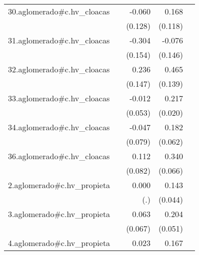 {\begin{longtable}{l*{4}{D{.}{.}{-1}}}
\addlinespace
30.aglomerado#c.hv\_cloacas&                     &      -0.060         &       0.168         &                     \\
            &                     &     (0.128)         &     (0.118)         &                     \\
\addlinespace
31.aglomerado#c.hv\_cloacas&                     &      -0.304\sym{*}  &      -0.076         &                     \\
            &                     &     (0.154)         &     (0.146)         &                     \\
\addlinespace
32.aglomerado#c.hv\_cloacas&                     &       0.236         &       0.465\sym{***}&                     \\
            &                     &     (0.147)         &     (0.139)         &                     \\
\addlinespace
33.aglomerado#c.hv\_cloacas&                     &      -0.012         &       0.217\sym{***}&                     \\
            &                     &     (0.053)         &     (0.020)         &                     \\
\addlinespace
34.aglomerado#c.hv\_cloacas&                     &      -0.047         &       0.182\sym{**} &                     \\
            &                     &     (0.079)         &     (0.062)         &                     \\
\addlinespace
36.aglomerado#c.hv\_cloacas&                     &       0.112         &       0.340\sym{***}&                     \\
            &                     &     (0.082)         &     (0.066)         &                     \\
\addlinespace
2.aglomerado#c.hv\_propieta&                     &       0.000         &       0.143\sym{**} &                     \\
            &                     &         (.)         &     (0.044)         &                     \\
\addlinespace
3.aglomerado#c.hv\_propieta&                     &       0.063         &       0.204\sym{***}&                     \\
            &                     &     (0.067)         &     (0.051)         &                     \\
\addlinespace
4.aglomerado#c.hv\_propieta&                     &       0.023         &       0.167\sym{***}&                     \\

\end{longtable}}
